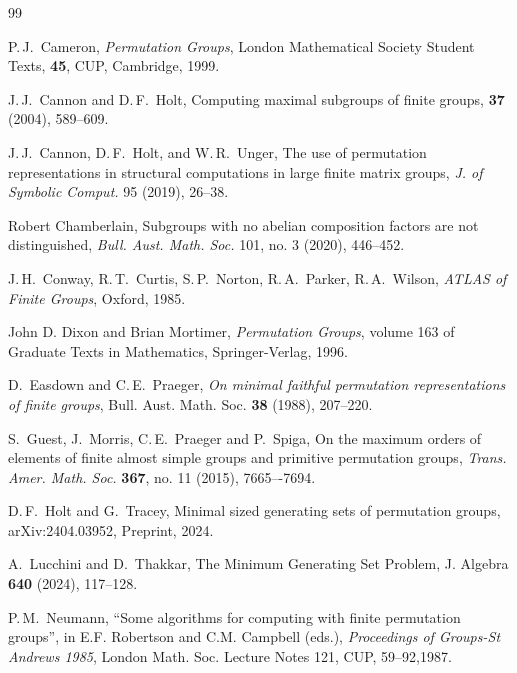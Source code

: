 \documentclass[12pt,a4paper]{article}
\begin{document}
\begin{thebibliography}{99}

 P.\,J.~Cameron,
\emph{Permutation Groups},
London Mathematical Society Student Texts, \textbf{45}, CUP, Cambridge, 1999.

J.\,J.~Cannon and D.\,F.~Holt,
\newblock Computing maximal subgroups of finite groups,
 {\bf 37} (2004), 589--609.

J.\,J.~Cannon, D.\,F.~Holt, and W.\,R.~Unger,
The use of permutation representations in structural computations in large
finite matrix groups,
{\em J. of Symbolic Comput.} 95 (2019), 26--38.

Robert Chamberlain,
Subgroups with no abelian composition factors are not distinguished,
{\em Bull. Aust. Math. Soc.} {101}, no. 3 (2020), 446--452.


J.\,H.\ Conway, R.\,T.\ Curtis, S.\,P.\ Norton, R.\,A.\ Parker, R.\,A.\ Wilson,
{\em ATLAS of Finite Groups}, Oxford, 1985.

John D. Dixon and Brian Mortimer,
\emph{Permutation Groups}, volume 163 of Graduate Texts in Mathematics,
Springer-Verlag, 1996.

D.~Easdown and C.\,E.~Praeger, {\em On minimal faithful permutation
representations of finite groups}, Bull. Aust. Math. Soc. {\bf 38} (1988),
207--220.

S.~Guest, J.~Morris, C.\,E.~Praeger and P.~Spiga,
On the maximum orders of elements of finite almost
  simple groups and primitive permutation groups,
{\em Trans. Amer. Math. Soc.} {\bf 367}, no. 11 (2015), 7665–-7694.

D.\,F.~Holt and G.~Tracey,
Minimal sized generating sets of permutation groups,
{arXiv:2404.03952}, Preprint, 2024.

 A.~Lucchini and D.~Thakkar,
The Minimum Generating Set Problem,
{J. Algebra} {\bf 640} (2024), 117--128.

 P.\,M.~Neumann,
``Some algorithms for computing with finite permutation groups'',
in E.F. Robertson and C.M. Campbell (eds.), {\em Proceedings of
Groups-St Andrews 1985}, London Math. Soc. Lecture Notes 121, CUP, 59--92,1987.
\end{thebibliography}
\end{document}

